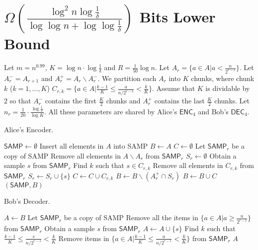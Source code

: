 \documentclass[10pt]{article}
\newcommand{\samp}{\textsf{SAMP}\xspace}
\newcommand{\enc}{\textsf{ENC}\xspace}
\newcommand{\dec}{\textsf{DEC}\xspace}
\begin{document}
\section{$\Omega(\frac{\log^2 n\log{\frac{1}{\delta}}}{\log\log n+\log\log \frac{1}{\delta}})$ Bits Lower Bound}

Let $m=n^{0.99}$, $K=\log n \cdot \log \frac{1}{\delta}$ and $R=\frac{1}{50}\log n$. Let $A_r = \{a\in A|a<\frac{n}{2^{r-1}}\}$. Let $A_r^{-}=A_{r+1}$ and $A_r^{+}=A_r \backslash A_r^{-}$. We partition each $A_r$ into $K$ chunks, where chunk $k$ ($k=1,\ldots,K$) $C_{r,k}=\{a\in A|\frac{k-1}{K} \le \frac{a}{n/2^{r-1}} < \frac{k}{K} \}$. Assume that $K$ is dividable by $2$ so that $A_r^{-}$ contains the first $\frac{K}{2}$ chunks and $A_r^{+}$ contains the last $\frac{K}{2}$ chunks. Let $n_r=\frac{1}{20} \cdot \frac{\log \frac{1}{\delta}}{\log K}$.
All these parameters are shared by Alice's $\enc_4$ and Bob's $\dec_4$. 

\begin{algorithm}[H]
  \caption{Alice's Encoder.}
  \begin{algorithmic}[1]
    \Procedure{$\enc_4$}{$A$}
    \State $\samp \leftarrow \emptyset$
    \State Insert all elements in $A$ into \samp
    \State $B\leftarrow A$
    \State $C\leftarrow \emptyset$
      \State Let $\samp_r$ be a copy of \samp
      \State Remove all elements in $A\backslash A_r$ from $\samp_r$
      \State $S_r\leftarrow \emptyset$
        \State Obtain a sample $s$ from $\samp_r$
        \State Find $k$ such that $s\in C_{r,k}$
        \State Remove all elements in $C_{r,k}$ from $\samp_r$
        \State $S_r\leftarrow S_r \cup \{s\}$
          \State $C\leftarrow C \cup C_{r,k}$
        \EndIf
      \EndFor
      \State $B \leftarrow B \backslash (A_r^{+}\cap S_r)$
    \EndFor
    \State $B\leftarrow B \cup C$
    \State \Return $(\samp, B)$ 
    \EndProcedure
  \end{algorithmic}
\end{algorithm}


\begin{algorithm}[H]
  \caption{Bob's Decoder.}
  \begin{algorithmic}[1]
    \Procedure{$\dec_4$}{\samp, $B$}
    \State $A\leftarrow B$
      \State Let $\samp_r$ be a copy of \samp 
      \State Remove all the items in $\{a\in A|a\ge \frac{n}{2^{r-1}}\}$ from $\samp_r$
      \State Obtain a sample $s$ from $\samp_r$
      \State $A\leftarrow A \cup \{s\}$
      \State Find $k$ such that $\frac{k-1}{K} \le \frac{s}{n/2^{r-1}} < \frac{k}{K}$
      \State Remove items in $\{a\in A|\frac{k-1}{K} \le \frac{a}{n/2^{r-1}} < \frac{k}{K} \}$ from $\samp_r$
      \EndFor
    \EndFor
    \State \Return $A$ 
    \EndProcedure
  \end{algorithmic}
\end{algorithm}
\end{document}
